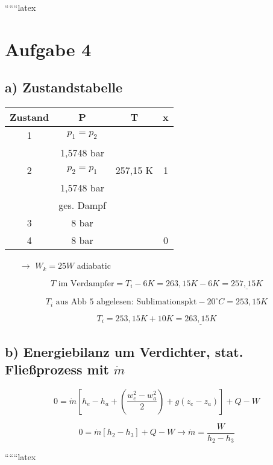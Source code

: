 
``````latex


\section*{Aufgabe 4}

\subsection*{a) Zustandstabelle}

\begin{tabular}{|c|c|c|c|}
\hline
Zustand & P & T & x \\
\hline
1 & $p_1 = p_2$ & & \\
  & 1,5748 bar & & \\
\hline
2 & $p_2 = p_1$ & 257,15 K & 1 \\
  & 1,5748 bar & & \\
  & ges. Dampf & & \\
\hline
3 & 8 bar & & \\
\hline
4 & 8 bar & & 0 \\
\hline
\end{tabular}

\begin{itemize}
    \item[$\rightarrow$] $W_k = 25W$ adiabatic
\end{itemize}

\[
T \text{ im Verdampfer} = T_i - 6K = 263,15K - 6K = \underline{257,15K}
\]

\[
T_i \text{ aus Abb 5 abgelesen: Sublimationspkt} -20^\circ C = 253,15K
\]

\[
T_i = 253,15K + 10K = \underline{263,15K}
\]

\subsection*{b) Energiebilanz um Verdichter, stat. Fließprozess mit $\dot{m}$}

\[
0 = \dot{m} \left[ h_e - h_a + \left( \frac{w_e^2 - w_a^2}{2} \right) + g \left( z_e - z_a \right) \right] + Q - W
\]

\[
0 = \dot{m} \left[ h_2 - h_3 \right] + Q - W \rightarrow \dot{m} = \frac{W}{h_2 - h_3}
\]

``````latex



